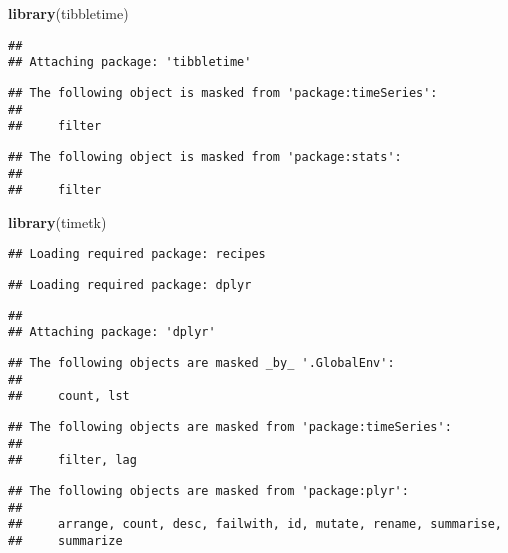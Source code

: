\documentclass[]{article}
\newenvironment{Shaded}{\begin{snugshade}}{\end{snugshade}}
\newcommand{\KeywordTok}[1]{\textcolor[rgb]{0.13,0.29,0.53}{\textbf{#1}}}
\newcommand{\NormalTok}[1]{#1}
\begin{document}
\begin{Shaded}
\begin{Highlighting}[]
\KeywordTok{library}\NormalTok{(tibbletime)}
\end{Highlighting}
\end{Shaded}

\begin{verbatim}
## 
## Attaching package: 'tibbletime'
\end{verbatim}

\begin{verbatim}
## The following object is masked from 'package:timeSeries':
## 
##     filter
\end{verbatim}

\begin{verbatim}
## The following object is masked from 'package:stats':
## 
##     filter
\end{verbatim}

\begin{Shaded}
\begin{Highlighting}[]
\KeywordTok{library}\NormalTok{(timetk)}
\end{Highlighting}
\end{Shaded}

\begin{verbatim}
## Loading required package: recipes
\end{verbatim}

\begin{verbatim}
## Loading required package: dplyr
\end{verbatim}

\begin{verbatim}
## 
## Attaching package: 'dplyr'
\end{verbatim}

\begin{verbatim}
## The following objects are masked _by_ '.GlobalEnv':
## 
##     count, lst
\end{verbatim}

\begin{verbatim}
## The following objects are masked from 'package:timeSeries':
## 
##     filter, lag
\end{verbatim}

\begin{verbatim}
## The following objects are masked from 'package:plyr':
## 
##     arrange, count, desc, failwith, id, mutate, rename, summarise,
##     summarize
\end{verbatim}
\end{document}
